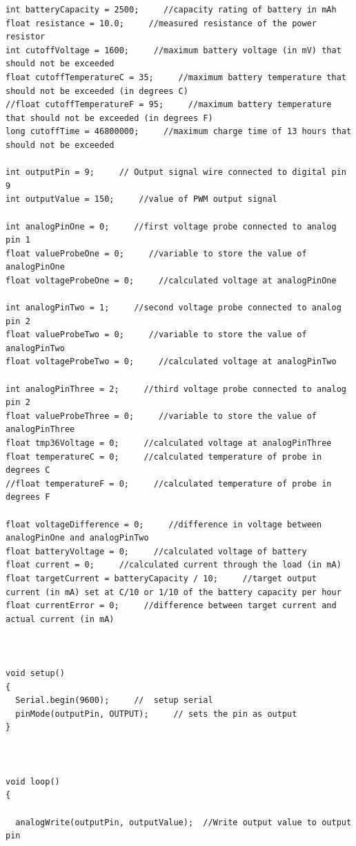 \documentclass[a4paper, 11pt]{article}           %
\begin{document}
\scriptsize %
\begin{verbatim}
int batteryCapacity = 2500;     //capacity rating of battery in mAh
float resistance = 10.0;     //measured resistance of the power resistor
int cutoffVoltage = 1600;     //maximum battery voltage (in mV) that should not be exceeded
float cutoffTemperatureC = 35;     //maximum battery temperature that should not be exceeded (in degrees C)
//float cutoffTemperatureF = 95;     //maximum battery temperature that should not be exceeded (in degrees F)
long cutoffTime = 46800000;     //maximum charge time of 13 hours that should not be exceeded

int outputPin = 9;     // Output signal wire connected to digital pin 9
int outputValue = 150;     //value of PWM output signal

int analogPinOne = 0;     //first voltage probe connected to analog pin 1
float valueProbeOne = 0;     //variable to store the value of analogPinOne
float voltageProbeOne = 0;     //calculated voltage at analogPinOne

int analogPinTwo = 1;     //second voltage probe connected to analog pin 2
float valueProbeTwo = 0;     //variable to store the value of analogPinTwo
float voltageProbeTwo = 0;     //calculated voltage at analogPinTwo

int analogPinThree = 2;     //third voltage probe connected to analog pin 2
float valueProbeThree = 0;     //variable to store the value of analogPinThree
float tmp36Voltage = 0;     //calculated voltage at analogPinThree
float temperatureC = 0;     //calculated temperature of probe in degrees C
//float temperatureF = 0;     //calculated temperature of probe in degrees F

float voltageDifference = 0;     //difference in voltage between analogPinOne and analogPinTwo
float batteryVoltage = 0;     //calculated voltage of battery
float current = 0;     //calculated current through the load (in mA)
float targetCurrent = batteryCapacity / 10;     //target output current (in mA) set at C/10 or 1/10 of the battery capacity per hour
float currentError = 0;     //difference between target current and actual current (in mA)



void setup()
{
  Serial.begin(9600);     //  setup serial
  pinMode(outputPin, OUTPUT);     // sets the pin as output
}



void loop()
{

  analogWrite(outputPin, outputValue);  //Write output value to output pin


\end{verbatim}
\end{document}
